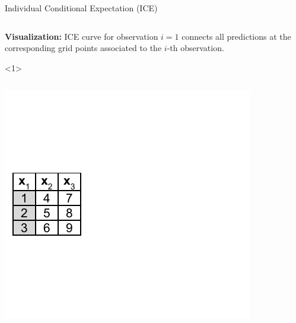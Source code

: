 \documentclass[11pt,compress,t,notes=noshow, xcolor=table]{beamer}
\begin{document}
\begin{vbframe}{Individual Conditional Expectation (ICE)}
\begin{onlyenv}
\begin{columns}[T]
\begin{column}{0.5\textwidth}
\end{column}
\end{columns}
\end{onlyenv}

\textbf{Visualization:} ICE curve for observation $i=1$ connects all predictions at the corresponding grid points associated to the $i$-th observation.

\framebreak
\begin{onlyenv}<1>
  \vspace{1cm}
    \begin{columns}[T]
\begin{column}{0.5\textwidth}
\centering
\includegraphics[page=6, width=\textwidth]{figure_man/ice_pd_plot_demo}
  \end{column}
 \begin{column}{0.5\textwidth}
\vspace{0.3cm}


\end{column}
\end{columns}
\end{onlyenv}
\end{vbframe}
\end{document}

